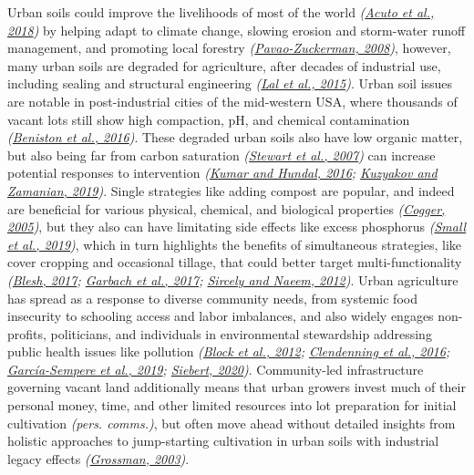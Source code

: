 \documentclass[
  12pt,
]{article}
\begin{document}
Urban soils could improve the livelihoods of most of the world \emph{(\protect\hyperlink{ref-acuto18}{Acuto et al., 2018})} by helping adapt to climate change, slowing erosion and storm-water runoff management, and promoting local forestry \emph{(\protect\hyperlink{ref-pavao-zuckerman08}{Pavao-Zuckerman, 2008})}, however, many urban soils are degraded for agriculture, after decades of industrial use, including sealing and structural engineering \emph{(\protect\hyperlink{ref-lal15}{Lal et al., 2015})}.
Urban soil issues are notable in post-industrial cities of the mid-western USA, where thousands of vacant lots still show high compaction, pH, and chemical contamination \emph{(\protect\hyperlink{ref-beniston16}{Beniston et al., 2016})}.
These degraded urban soils also have low organic matter, but also being far from carbon saturation \emph{(\protect\hyperlink{ref-stewart07}{Stewart et al., 2007})} can increase potential responses to intervention \emph{(\protect\hyperlink{ref-kumar16}{Kumar and Hundal, 2016}; \protect\hyperlink{ref-kuzyakov19}{Kuzyakov and Zamanian, 2019})}.
Single strategies like adding compost are popular, and indeed are beneficial for various physical, chemical, and biological properties \emph{(\protect\hyperlink{ref-cogger05}{Cogger, 2005})}, but they also can have limitating side effects like excess phosphorus \emph{(\protect\hyperlink{ref-small19}{Small et al., 2019})}, which in turn highlights the benefits of simultaneous strategies, like cover cropping and occasional tillage, that could better target multi-functionality \emph{(\protect\hyperlink{ref-blesh17}{Blesh, 2017}; \protect\hyperlink{ref-garbach17}{Garbach et al., 2017}; \protect\hyperlink{ref-sircely12}{Sircely and Naeem, 2012})}.
Urban agriculture has spread as a response to diverse community needs, from systemic food insecurity to schooling access and labor imbalances, and also widely engages non-profits, politicians, and individuals in environmental stewardship addressing public health issues like pollution \emph{(\protect\hyperlink{ref-block12}{Block et al., 2012}; \protect\hyperlink{ref-clendenning16}{Clendenning et al., 2016}; \protect\hyperlink{ref-garcia-sempere19}{García-Sempere et al., 2019}; \protect\hyperlink{ref-siebert20}{Siebert, 2020})}.
Community-led infrastructure governing vacant land additionally means that urban growers invest much of their personal money, time, and other limited resources into lot preparation for initial cultivation \emph{(pers. comms.)},
but often move ahead without detailed insights from holistic approaches to jump-starting cultivation in urban soils with industrial legacy effects \emph{(\protect\hyperlink{ref-grossman03}{Grossman, 2003})}.
\end{document}

